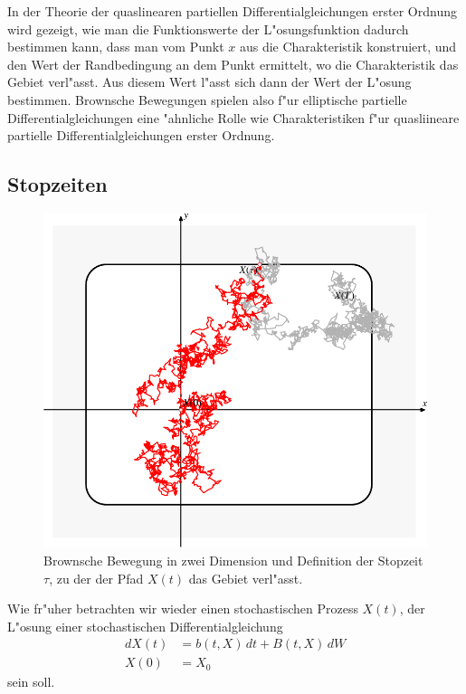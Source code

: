 In der Theorie der quaslinearen partiellen Differentialgleichungen erster
Ordnung wird gezeigt, wie man die Funktionswerte der L"osungsfunktion
dadurch bestimmen kann, dass man vom Punkt $x$ aus die Charakteristik 
konstruiert, und den Wert der Randbedingung an dem Punkt ermittelt,
wo die Charakteristik das Gebiet verl"asst.
Aus diesem Wert l"asst sich dann der Wert der L"osung bestimmen.
Brownsche Bewegungen spielen also f"ur elliptische partielle
Differentialgleichungen eine "ahnliche Rolle wie Charakteristiken f"ur
quasliineare partielle Differentialgleichungen erster Ordnung.

\subsection{Stopzeiten}
\begin{figure}
\centering
\includegraphics{chapters/images/stochastisch-2.pdf}
\caption{Brownsche Bewegung in zwei Dimension und Definition der
Stopzeit $\tau$, zu der der Pfad $X(t)$ das Gebiet verl"asst.
%
\label{stochastisch:pfad}}
\end{figure}%
Wie fr"uher betrachten wir wieder einen stochastischen Prozess $X(t)$,
der L"osung einer stochastischen Differentialgleichung
\begin{equation}
\begin{aligned}
dX(t)&=b(t,X)\,dt + B(t,X)\,dW
\\
X(0)&=X_0
\end{aligned}
\label{stochastisch:stopzeitdgl}
\end{equation}
sein soll.

